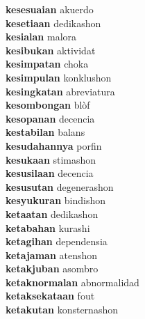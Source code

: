 \textbf{kesesuaian } akuerdo \\
\textbf{kesetiaan } dedikashon \\
\textbf{kesialan } malora \\
\textbf{kesibukan } aktividat \\
\textbf{kesimpatan } choka \\
\textbf{kesimpulan } konklushon \\
\textbf{kesingkatan } abreviatura \\
\textbf{kesombongan } blòf \\
\textbf{kesopanan } decencia \\
\textbf{kestabilan } balans \\
\textbf{kesudahannya } porfin \\
\textbf{kesukaan } stimashon \\
\textbf{kesusilaan } decencia \\
\textbf{kesusutan } degenerashon \\
\textbf{kesyukuran } bindishon \\
\textbf{ketaatan } dedikashon \\
\textbf{ketabahan } kurashi \\
\textbf{ketagihan } dependensia \\
\textbf{ketajaman } atenshon \\
\textbf{ketakjuban } asombro \\
\textbf{ketaknormalan } abnormalidad \\
\textbf{ketaksekataan } fout \\
\textbf{ketakutan } konsternashon \\
